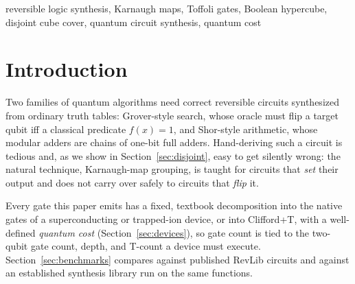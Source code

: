 \documentclass[conference]{IEEEtran}
\theoremstyle{plain}
\begin{document}
\begin{IEEEkeywords}
reversible logic synthesis, Karnaugh maps, Toffoli gates, Boolean
hypercube, disjoint cube cover, quantum circuit synthesis, quantum cost
\end{IEEEkeywords}

\section{Introduction}

Two families of quantum algorithms need correct reversible circuits
synthesized from ordinary truth tables: Grover-style search, whose oracle
must flip a target qubit iff a classical predicate $f(x)=1$, and
Shor-style arithmetic, whose modular adders are chains of one-bit full
adders. Hand-deriving such a circuit is tedious and, as we show in
Section~\ref{sec:disjoint}, easy to get silently wrong: the natural
technique, Karnaugh-map grouping, is taught for circuits that \emph{set}
their output and does not carry over safely to circuits that \emph{flip}
it.

Every gate this paper emits has a fixed, textbook decomposition into the
native gates of a superconducting or trapped-ion device, or into
Clifford+T, with a well-defined \emph{quantum cost}
(Section~\ref{sec:devices}), so gate count is tied to the two-qubit gate
count, depth, and T-count a device must execute.
Section~\ref{sec:benchmarks} compares against published RevLib circuits
and against an established synthesis library run on the same functions.
\end{document}

